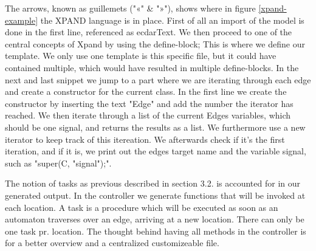 The arrows, known as guillemets ("«" & "»"), shows where in figure \ref{xpand-example} the XPAND language is in place. First of all an import of the model is done in the first line, referenced as ecdarText. We then proceed to one of the central concepts of Xpand by using the define-block; This is where we define our template. We only use one template is this specific file, but it could have contained multiple, which would have resulted in multiple define-blocks. In the next and last snippet we jump to a part where we are iterating through each edge and create a constructor for the current class. In the first line we create the constructor by inserting the text "Edge" and add the number the iterator has reached. We then iterate through a list of the current Edges variables, which should be one signal, and returns the results as a list. We furthermore use a new iterator to keep track of this itereation. We afterwards check if it's the first iteration, and if it is, we print out the edges target name and the variable signal, such as "super(C, "signal");".

The notion of tasks as previous described in section 3.2. is accounted for in our generated output. In the controller we generate functions that will be invoked at each location. A task is a procedure which will be executed as soon as an automaton traverses over an edge, arriving at a new location. There can only be one task pr. location. The thought behind having all methods in the controller is for a better overview and a centralized customizeable file.
